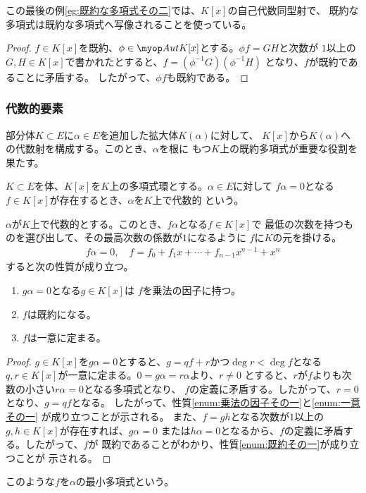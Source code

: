 {	この最後の例\ref{eg:既約な多項式その二}では、$K[x]$の自己代数同型射で、
	既約な多項式は既約な多項式へ写像されることを使っている。
	\begin{proof} %
		$f\in K[x]$を既約、$\phi\in\Aut K[x]$とする。$\phi f=GH$と次数が
		$1$以上の$G,H\in K[x]$で書かれたとすると、$f=(\phi^{-1}G)(\phi^{-1}H)$
		となり、$f$が既約であることに矛盾する。
		したがって、$\phi f$も既約である。
	\end{proof} %
\subsubsection{代数的要素}\label{s3:代数的要素} %
	\begin{minipage}{0.9\hsize}{\small
		部分体$K\subset E$に$\alpha\in E$を追加した拡大体$K(\alpha)$に対して、
		$K[x]$から$K(\alpha)$への代数射を構成する。このとき、$\alpha$を根に
		もつ$K$上の既約多項式が重要な役割を果たす。
	}\end{minipage}\medskip

	$K\subset E$を体、$K[x]$を$K$上の多項式環とする。$\alpha\in E$に対して
	$f\alpha=0$となる$f\in K[x]$が存在するとき、$\alpha$を$K$上で代数的
	という。

	$\alpha$が$K$上で代数的とする。このとき、$f\alpha$となる$f\in K[x]$で
	最低の次数を持つものを選び出して、その最高次数の係数が$1$になるように
	$f$に$K$の元を掛ける。
	\begin{equation*}\begin{split}
		f\alpha = 0,\quad f = f_0 + f_1x +\cdots+ f_{n-1}x^{n-1} + x^n
	\end{split}\end{equation*}
	すると次の性質が成り立つ。
	\begin{enumerate}\setlength{\itemsep}{-1mm} %
		\item\label{enum:乗法の因子その一} $g\alpha=0$となる$g\in K[x]$は
		$f$を乗法の因子に持つ。
		\item\label{enum:既約その一} $f$は既約になる。
		\item\label{enum:一意その一} $f$は一意に定まる。
	\end{enumerate} %
	\begin{proof} %
		$g\in K[x]$を$g\alpha=0$とすると、$g=qf+r$かつ$\deg r<\deg f$となる
		$q,r\in K[x]$が一意に定まる。$0=g\alpha=r\alpha$より、$r\neq 0$
		とすると、$r$が$f$よりも次数の小さい$r\alpha=0$となる多項式となり、
		$f$の定義に矛盾する。したがって、$r=0$となり、$g=qf$となる。
		したがって、性質\ref{enum:乗法の因子その一}と\ref{enum:一意その一}
		が成り立つことが示される。
		また、$f=gh$となる次数が$1$以上の$g,h\in K[x]$が存在すれば、$g\alpha=0$
		または$h\alpha=0$となるから、$f$の定義に矛盾する。したがって、$f$が
		既約であることがわかり、性質\ref{enum:既約その一}が成り立つことが
		示される。
	\end{proof} %
	このような$f$を$\alpha$の最小多項式という。

}

